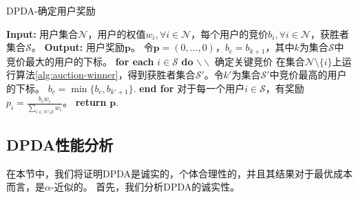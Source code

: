 	
	\begin{algorithm}
		\caption{DPDA-确定用户奖励}
		\label{alg:auction-payment}
		\begin{algorithmic}[1]
			\STATE \textbf{Input:} 用户集合$\mathcal{N}$，用户的权值$w_i, \forall i\in\mathcal{N}$，每个用户的竞价$b_i, \forall i\in\mathcal{N}$，获胜者集合$\mathcal{S}$。
			\STATE \textbf{Output:} 用户奖励$\mathbf{p}$。
			\STATE 令$\mathbf{p}=(0,\dots,0)$，$b_c=b_{k+1}$，其中$k$为集合$\mathcal{S}$中竞价最大的用户的下标。
			\STATE \textbf{for each} $i\in\mathcal{S}$ \textbf{do} $\backslash\backslash$ 确定关键竞价			\STATE \quad 在集合$\mathcal{N}\setminus\{i\}$上运行算法\ref{alg:auction-winner}，得到获胜者集合$\mathcal{S}'$。令$k'$为集合$\mathcal{S}'$中竞价最高的用户的下标。 
			\STATE \quad $b_c=\min\{b_c, b_{k'+1}\}$.
			\STATE \textbf{end for}
			\STATE 对于每一个用户$i\in\mathcal{S}$，有奖励$p_i=\frac{b_{c}w_i}{\sum_{i\in\mathcal{N}\setminus\mathcal{S}}w_i}$。
			\STATE \textbf{return} $\mathbf{p}$.
		\end{algorithmic}
	\end{algorithm}
	
	
	
	\subsection{DPDA性能分析}\label{sec:analysis}
	在本节中，我们将证明DPDA是诚实的，个体合理性的，并且其结果对于最优成本而言，是$\alpha$-近似的。
	首先，我们分析DPDA的诚实性。
	
